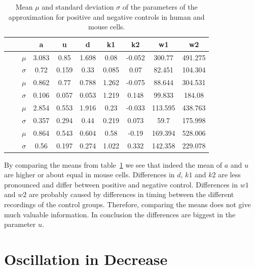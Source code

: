 \begin{table}[h]
	\centering
	\begin{tabular}{|c|c|c|c|c|c|c|c|c|c|}
		\hline
		& & & a & u & d & k1 & k2 & w1 & w2\\
		\hline
		\multirow{4}{*}{\rotatebox[origin=c]{90}{mouse}} & \multirow{2}{*}{\rotatebox[origin=c]{90}{pos}} & $\mu$ & 3.083 & 0.85 & 1.698 & 0.08 & -0.052 & 300.77 & 491.275\\
		\cline{3-10}
		& & $\sigma$ & 0.72 & 0.159 & 0.33 & 0.085 & 0.07 & 82.451 & 104.304\\
		\cline{2-10}
		& \multirow{2}{*}{\rotatebox[origin=c]{90}{neg}} & $\mu$ & 0.862 & 0.77 & 0.788 & 1.262 & -0.075 & 88.644 & 304.531\\
		\cline{3-10}
		& & $\sigma$ & 0.106 & 0.057 & 0.053 & 1.219 & 0.148 & 99.833 & 184.08\\
		\hline
		\multirow{4}{*}{\rotatebox[origin=c]{90}{human}} & \multirow{2}{*}{\rotatebox[origin=c]{90}{pos}} & $\mu$ & 2.854 & 0.553 &  1.916 & 0.23 & -0.033 & 113.595 & 438.763\\
		\cline{3-10}
		& & $\sigma$ & 0.357 & 0.294 & 0.44 & 0.219 & 0.073 & 59.7 & 175.998\\
		\cline{2-10}
		& \multirow{2}{*}{\rotatebox[origin=c]{90}{neg}} & $\mu$ & 0.864 & 0.543 & 0.604 & 0.58 & -0.19 & 169.394 & 528.006 \\
		\cline{3-10}
		& & $\sigma$ & 0.56 & 0.197 & 0.274 & 1.022 & 0.332 & 142.358 & 229.078 \\
		\hline
	\end{tabular}
	\caption{Mean $\mu$ and standard deviation $\sigma$ of the parameters of the approximation for positive and negative controls in human and mouse cells.}
	\label{tab:mean_std_parameters}
\end{table}

By comparing the means from table~\ref{tab:mean_std_parameters} we see that indeed the mean of $a$ and $u$ are higher or about equal in mouse cells. Differences in $d$, $k1$ and $k2$ are less pronounced and differ between positive and negative control. Differences in $w1$ and $w2$ are probably caused by differences in timing between the different recordings of the control groups. Therefore, comparing the means does not give much valuable information. In conclusion the differences are biggest in the parameter $u$.

\section{Oscillation in Decrease}

